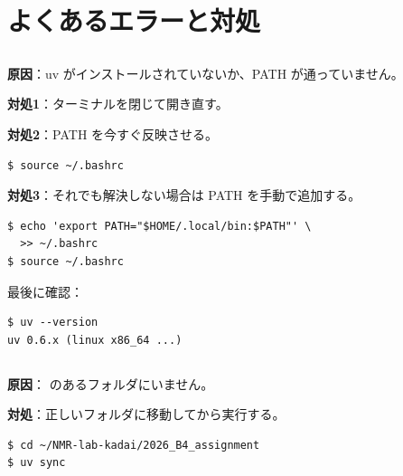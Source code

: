 \chapter{よくあるエラーと対処}
\label{chap:errors}

\section{}

\textbf{原因}：uv がインストールされていないか、PATH が通っていません。

\textbf{対処1}：ターミナルを閉じて開き直す。

\textbf{対処2}：PATH を今すぐ反映させる。

\begin{wslbox}
\begin{lstlisting}[style=bash]
$ source ~/.bashrc
\end{lstlisting}
\end{wslbox}

\textbf{対処3}：それでも解決しない場合は PATH を手動で追加する。

\begin{wslbox}
\begin{lstlisting}[style=bash]
$ echo 'export PATH="$HOME/.local/bin:$PATH"' \
  >> ~/.bashrc
$ source ~/.bashrc
\end{lstlisting}
\end{wslbox}

最後に確認：

\begin{wslbox}[確認]
\begin{lstlisting}[style=bash]
$ uv --version
uv 0.6.x (linux x86_64 ...)
\end{lstlisting}
\end{wslbox}

\section{}

\textbf{原因}： のあるフォルダにいません。

\textbf{対処}：正しいフォルダに移動してから実行する。

\begin{wslbox}[正しいフォルダへ移動して実行]
\begin{lstlisting}[style=bash]
$ cd ~/NMR-lab-kadai/2026_B4_assignment
$ uv sync
\end{lstlisting}
\end{wslbox}


